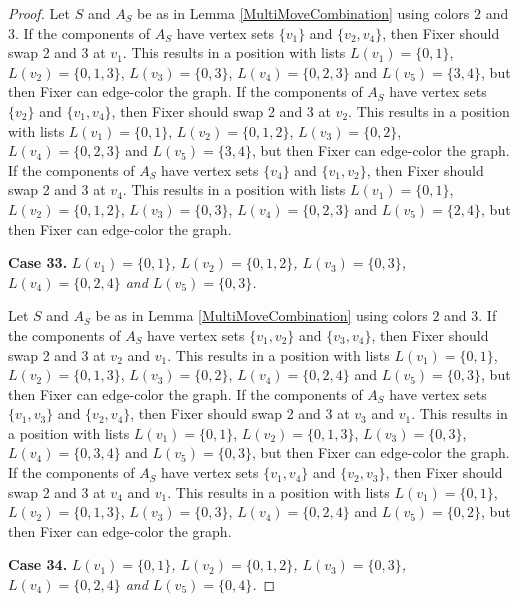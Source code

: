 \documentclass[12pt]{amsart}
\theoremstyle{plain}
\theoremstyle{definition}
\theoremstyle{remark}
\begin{document}
\begin{proof}
Let $S$ and $A_S$ be as in Lemma \ref{MultiMoveCombination} using colors $2$ and $3$. If the components of $A_S$ have vertex sets $\{v_1\}$ and $\{v_2, v_4\}$, then Fixer should swap 2 and 3 at $v_1$. This results in a position with lists $L(v_1) = \{0, 1\}$, $L(v_2) = \{0, 1, 3\}$, $L(v_3) = \{0, 3\}$, $L(v_4) = \{0, 2, 3\}$ and $L(v_5) = \{3, 4\}$, but then Fixer can edge-color the graph.
If the components of $A_S$ have vertex sets $\{v_2\}$ and $\{v_1, v_4\}$, then Fixer should swap 2 and 3 at $v_2$. This results in a position with lists $L(v_1) = \{0, 1\}$, $L(v_2) = \{0, 1, 2\}$, $L(v_3) = \{0, 2\}$, $L(v_4) = \{0, 2, 3\}$ and $L(v_5) = \{3, 4\}$, but then Fixer can edge-color the graph.
If the components of $A_S$ have vertex sets $\{v_4\}$ and $\{v_1, v_2\}$, then Fixer should swap 2 and 3 at $v_4$. This results in a position with lists $L(v_1) = \{0, 1\}$, $L(v_2) = \{0, 1, 2\}$, $L(v_3) = \{0, 3\}$, $L(v_4) = \{0, 2, 3\}$ and $L(v_5) = \{2, 4\}$, but then Fixer can edge-color the graph.

\noindent\textbf{Case 33.  }\textit{$L(v_1) = \{0, 1\}$, $L(v_2) = \{0, 1, 2\}$, $L(v_3) = \{0, 3\}$, $L(v_4) = \{0, 2, 4\}$ and $L(v_5) = \{0, 3\}$.}

Let $S$ and $A_S$ be as in Lemma \ref{MultiMoveCombination} using colors $2$ and $3$. If the components of $A_S$ have vertex sets $\{v_1, v_2\}$ and $\{v_3, v_4\}$, then Fixer should swap 2 and 3 at $v_2$ and $v_1$. This results in a position with lists $L(v_1) = \{0, 1\}$, $L(v_2) = \{0, 1, 3\}$, $L(v_3) = \{0, 2\}$, $L(v_4) = \{0, 2, 4\}$ and $L(v_5) = \{0, 3\}$, but then Fixer can edge-color the graph.
If the components of $A_S$ have vertex sets $\{v_1, v_3\}$ and $\{v_2, v_4\}$, then Fixer should swap 2 and 3 at $v_3$ and $v_1$. This results in a position with lists $L(v_1) = \{0, 1\}$, $L(v_2) = \{0, 1, 3\}$, $L(v_3) = \{0, 3\}$, $L(v_4) = \{0, 3, 4\}$ and $L(v_5) = \{0, 3\}$, but then Fixer can edge-color the graph.
If the components of $A_S$ have vertex sets $\{v_1, v_4\}$ and $\{v_2, v_3\}$, then Fixer should swap 2 and 3 at $v_4$ and $v_1$. This results in a position with lists $L(v_1) = \{0, 1\}$, $L(v_2) = \{0, 1, 3\}$, $L(v_3) = \{0, 3\}$, $L(v_4) = \{0, 2, 4\}$ and $L(v_5) = \{0, 2\}$, but then Fixer can edge-color the graph.

\noindent\textbf{Case 34.  }\textit{$L(v_1) = \{0, 1\}$, $L(v_2) = \{0, 1, 2\}$, $L(v_3) = \{0, 3\}$, $L(v_4) = \{0, 2, 4\}$ and $L(v_5) = \{0, 4\}$.}


\end{proof}
\end{document}
